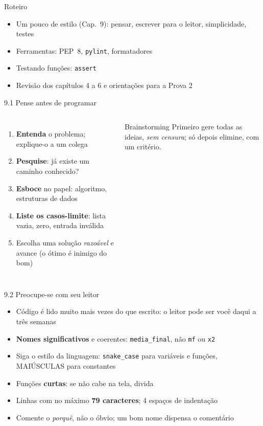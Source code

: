 \documentclass[aspectratio=169,10pt,t]{beamer}
\begin{document}
\capa

\begin{frame}{Roteiro}
  \begin{itemize}
    \item Um pouco de estilo (Cap.~9): pensar, escrever para o leitor, simplicidade, testes
    \item Ferramentas: PEP~8, \texttt{pylint}, formatadores
    \item Testando funções: \texttt{assert}
    \item Revisão dos capítulos 4 a 6 e orientações para a Prova 2
  \end{itemize}
\end{frame}

\begin{frame}{9.1 Pense antes de programar}
  \begin{columns}[T]
    \begin{enumerate}
      \item \textbf{Entenda} o problema; explique-o a um colega
      \item \textbf{Pesquise}: já existe um caminho conhecido?
      \item \textbf{Esboce} no papel: algoritmo, estruturas de dados
      \item \textbf{Liste os casos-limite}: lista vazia, zero, entrada inválida
      \item Escolha uma solução \emph{razoável} e avance (o ótimo é inimigo do bom)
    \end{enumerate}
    \begin{exampleblock}{Brainstorming}
      Primeiro gere todas as ideias, \emph{sem censura}; só depois elimine, com um critério.
    \end{exampleblock}
  \end{columns}
\end{frame}

\begin{frame}{9.2 Preocupe-se com seu leitor}
  \begin{itemize}
    \item Código é lido muito mais vezes do que escrito: o leitor pode ser \alert{você daqui a três semanas}
    \item \textbf{Nomes significativos} e coerentes: \texttt{media\_final}, não \texttt{mf} ou \texttt{x2}
    \item Siga o estilo da linguagem: \texttt{snake\_case} para variáveis e funções, MAIÚSCULAS para constantes
    \item Funções \textbf{curtas}: se não cabe na tela, divida
    \item Linhas com no máximo \textbf{79 caracteres}; 4 espaços de indentação
    \item Comente o \emph{porquê}, não o óbvio; um bom nome dispensa o comentário
  \end{itemize}
\end{frame}
\end{document}
